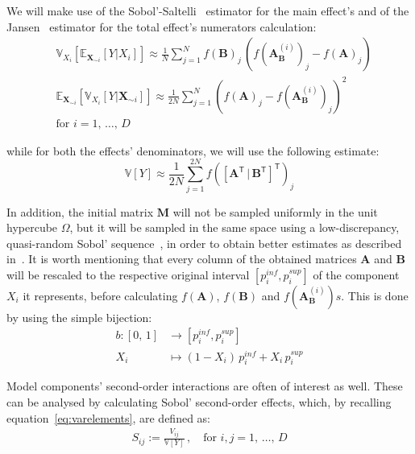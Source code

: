 \vspace{0.2cm}
We will make use of the Sobol'-Saltelli~\cite{Saltelli:2010} estimator for the main effect's and of the Jansen~\cite{Jansen:1999} estimator for the total effect's numerators calculation:
%
\begin{align}\label{eq:gsaestimators}
    & \mathbb{V}_{X_i}[\mathbb{E}_{\mathbf{X}_{\sim i}}[Y|X_i]] \approx \frac{1}{N}\sum_{j=1}^{N}f(\mathbf{B})_j\,(f(\mathbf{A}_{\mathbf{B}}^{(i)})_j - f(\mathbf{A})_j) \\
    & \mathbb{E}_{\mathbf{X}_{\sim i}}[\mathbb{V}_{X_i}[Y|\mathbf{X}_{\sim i}]] \approx \frac{1}{2N}\sum_{j=1}^{N}(f(\mathbf{A})_j-f(\mathbf{A}_{\mathbf{B}}^{(i)})_j)^2 \\
    & \text{for}\,\,i=1,\,\dots,\,D
\end{align}

\noindent
while for both the effects' denominators, we will use the following estimate:
%
\begin{equation}\label{eq:varianceestimate}
    \mathbb{V}[Y] \approx \frac{1}{2N} \sum_{j=1}^{2N} f([\mathbf{A}^\mathsf{T}\,|\,\mathbf{B}^\mathsf{T}]^\mathsf{T})_j
\end{equation}

\noindent
In addition, the initial matrix $\mathbf{M}$ will not be sampled uniformly in the unit hypercube $\Omega$, but it will be sampled in the same space using a low-discrepancy, quasi-random Sobol' sequence~\cite{Sobol:1967}, in order to obtain better estimates as described in~\cite{Saltelli:2010}. It is worth mentioning that every column of the obtained matrices $\mathbf{A}$ and $\mathbf{B}$ will be rescaled to the respective original interval $[p_i^{inf}, p_i^{sup}]$ of the component $X_i$ it represents, before calculating $f(\mathbf{A})$, $f(\mathbf{B})$ and $f(\mathbf{A}_{\mathbf{B}}^{(i)})s$. This is done by using the simple bijection:
%
\begin{align}
    b \colon [0,\,1] &\to [p_i^{inf}, p_i^{sup}] \\
    X_i &\mapsto (1 - X_i)\,p_i^{inf} + X_i\,p_i^{sup}
\end{align}

\vspace{0.2cm}
Model components' second-order interactions are often of interest as well. These can be analysed by calculating Sobol' second-order effects, which, by recalling equation~\eqref{eq:varelements}, are defined as:
%
\begin{align}\label{eq:secondordereffects}
    S_{ij} := \frac{V_{ij}}{\mathbb{V}[Y]}\,,\quad\text{for}\,\,i,j=1,\,\dots,\,D
\end{align}


